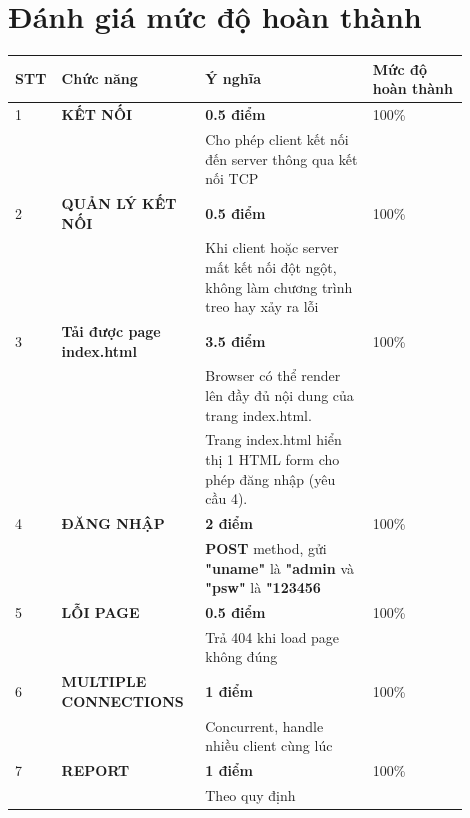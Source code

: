 \documentclass[14pt, a4paper]{extarticle}
\begin{document}
\section{Đánh giá mức độ hoàn thành}
\begin{table}[h!]
    \centering
    \begin{tabular}{| p{0.05\linewidth}| p{0.3\linewidth}| p{0.35\linewidth}| p{0.20\linewidth}|}
        \hline
        \textbf{STT}                & \textbf{Chức năng}                & \textbf{Ý nghĩa}                & \textbf{Mức độ hoàn thành} \\
        \hline
        1                & \textbf{KẾT NỐI}                  & \textbf{0.5 điểm}                  & 100\%                \\
                   &                  & Cho phép client kết nối đến server thông qua kết nối TCP                     &                \\
        \hline
        2                & \textbf{QUẢN LÝ KẾT NỐI}          & \textbf{0.5 điểm}                  & 100\%                \\
                   &                  & Khi client hoặc server mất kết nối đột ngột, không làm chương trình treo hay xảy ra lỗi             &                \\
        \hline
        3                & \textbf{Tải được page index.html} & \textbf{3.5 điểm}                  & 100\%                \\
                   &                  & Browser có thể render lên đầy đủ nội dung của trang index.html.                    &                \\
                   &                  &
        Trang index.html hiển thị 1 HTML form cho phép đăng nhập (yêu cầu 4). &                     \\
        \hline
        4                & \textbf{ĐĂNG NHẬP}                & \textbf{2 điểm}                 & 100\%                \\
                   &                  & \textbf{POST} method, gửi \textbf{"uname"} là \textbf{"admin} và \textbf{"psw"} là \textbf{"123456} &                \\
        \hline
        5                & \textbf{LỖI PAGE}                 & \textbf{0.5 điểm}                  & 100\%                \\
                   &                  & Trả 404 khi load page không đúng                 &                \\
        \hline
        6                & \textbf{MULTIPLE CONNECTIONS}     & \textbf{1 điểm}                 & 100\%                \\
                   &                  & Concurrent, handle nhiều client cùng lúc                  &                \\
        \hline
        7                & \textbf{REPORT}                   & \textbf{1 điểm}                 & 100\%                \\
                   &                  & Theo quy định                   &                \\
        \hline
    \end{tabular}
\end{table}
\end{document}
